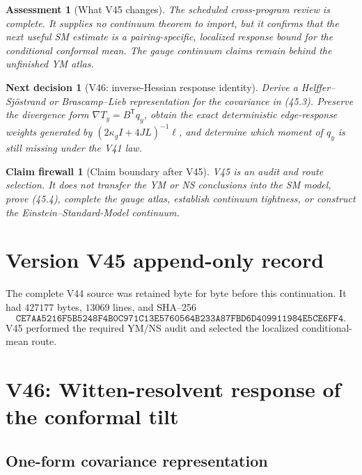 \documentclass[11pt]{article}
\newtheorem{firewall}[theorem]{Claim firewall}
\newtheorem{decision}[theorem]{Next decision}
\newtheorem{assessment}[theorem]{Assessment}
\theoremstyle{remark}
\begin{document}
\begin{assessment}[What V45 changes]
\label{ass:v17v45-status}
The scheduled cross-program review is complete.  It supplies no
continuum theorem to import, but it confirms that the next useful SM
estimate is a pairing-specific, localized response bound for the
conditional conformal mean.  The gauge continuum claims remain behind
the unfinished YM atlas.
\end{assessment}

\begin{decision}[V46: inverse-Hessian response identity]
\label{dec:v17v45-next}
Derive a Helffer--Sj\"ostrand or Brascamp--Lieb representation for the
covariance in (45.3).  Preserve the divergence form
\(\nabla T_y=B^{\mathsf T}q_y\), obtain the exact deterministic
edge-response weights generated by
\((2\kappa_gI+4JL)^{-1}\ell\), and determine which moment of \(q_y\)
is still missing under the V41 law.
\end{decision}

\begin{firewall}[Claim boundary after V45]
\label{fire:v17v45}
V45 is an audit and route selection.  It does not transfer the YM or
NS conclusions into the SM model, prove (45.4), complete the gauge
atlas, establish continuum tightness, or construct the
Einstein--Standard-Model continuum.
\end{firewall}

\section*{Version V45 append-only record}
The complete V44 source was retained byte for byte before this
continuation.  It had \(427177\) bytes, \(13069\) lines, and SHA--256
\[
 \texttt{CE7AA5216F5B5248F4B0C971C13E5760564B233A87FBD6D409911984E5CE6FF4}.
\]
V45 performed the required YM/NS audit and selected the localized
conditional-mean route.


\section{V46: Witten-resolvent response of the conformal tilt}
\label{sec:v17v46}

\subsection{One-form covariance representation}
\end{document}
